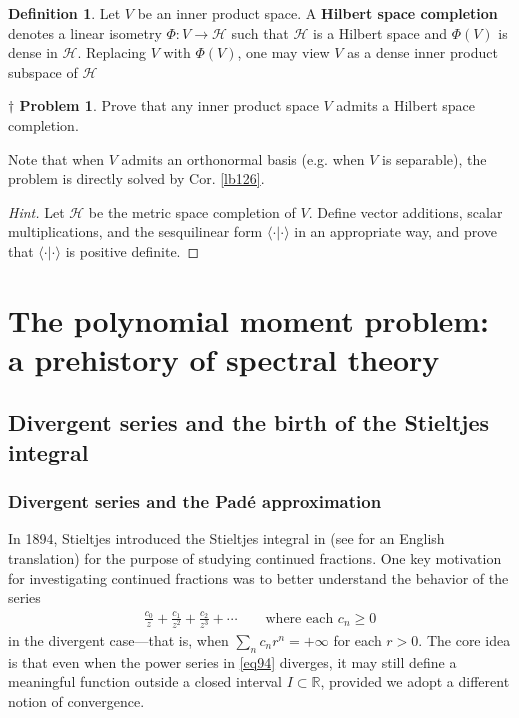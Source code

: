 \documentclass[12pt,b5paper,notitlepage]{article}
\theoremstyle{definition}
\newtheorem{df}{Definition}[subsection]
\newtheorem{dprob}[prob]{\color{red}$\dagger$ Problem}
\theoremstyle{plain}
\newcommand{\bk}[1]{\langle {#1}\rangle}
\newcommand{\Rbb}{\mathbb R}
\newcommand{\MH}{\mathcal H}
\numberwithin{equation}{section}
\begin{document}
\begin{df}
Let $V$ be an inner product space. A \textbf{Hilbert space completion}  denotes a linear isometry $\Phi:V\rightarrow\MH$ such that $\MH$ is a Hilbert space and $\Phi(V)$ is dense in $\MH$. Replacing $V$ with $\Phi(V)$, one may view $V$ as a dense inner product subspace of $\MH$
\end{df}


\begin{dprob}\label{lb350}
Prove that any inner product space $V$ admits a Hilbert space completion.
\end{dprob}

Note that when $V$ admits an orthonormal basis (e.g. when $V$ is separable), the problem is directly solved by Cor. \ref{lb126}.

\begin{proof}[Hint]
Let $\MH$ be the metric space completion of $V$. Define vector additions, scalar multiplications, and the sesquilinear form $\bk{\cdot|\cdot}$ in an appropriate way, and prove that $\bk{\cdot|\cdot}$ is positive definite. 
\end{proof}









\newpage



\section{The polynomial moment problem: a prehistory of spectral theory}\label{lb114}


\subsection{Divergent series and the birth of the Stieltjes integral}\label{lb182}


\subsubsection{Divergent series and the Pad\'e approximation}

In 1894, Stieltjes introduced the Stieltjes integral in \cite{Sti94} (see \cite[Vol. II]{Sti-C} for an English translation) for the purpose of studying continued fractions. One key motivation for investigating continued fractions was to better understand the behavior of the series
\begin{align}\label{eq94}
\frac{c_0}{z}+\frac{c_1}{z^2}+\frac{c_2}{z^3}+\cdots\qquad\text{where each }c_n\geq0
\end{align}
in the divergent case---that is, when $\sum_n c_nr^n=+\infty$ for each $r>0$. The core idea is that even when the power series in \eqref{eq94} diverges, it may still define a meaningful function outside a closed interval $I\subset\Rbb$, provided we adopt a different notion of convergence. 
\end{document}
